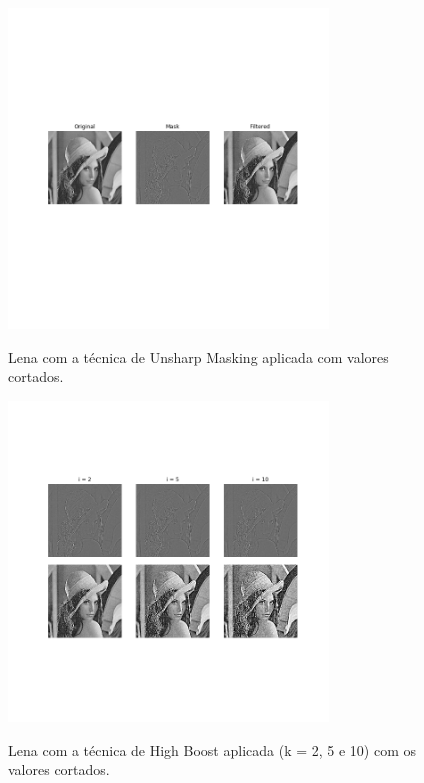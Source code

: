\documentclass{article}
\begin{document}
\begin{figure}[H]
	\label{fig:lena_mask_cut}
	\begin{minipage}[b]{1.0\linewidth}
		\centering
		\centerline{\includegraphics[width=8.5cm]{Figures/cutted_unsharp_mask}}
		Lena com a técnica de Unsharp Masking aplicada  com valores cortados.\medskip
	\end{minipage}
\end{figure}

\begin{figure}[H]
	\label{fig:lena_boost_cut}
	\begin{minipage}[b]{1.0\linewidth}
		\centering
		\centerline{\includegraphics[width=8.5cm]{Figures/cutted_high_boost}}
		Lena com a técnica de High Boost aplicada (k = 2, 5 e 10) com os valores cortados.\medskip
	\end{minipage}
\end{figure}
\end{document}
